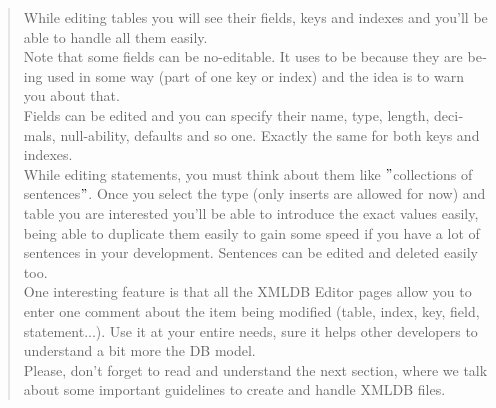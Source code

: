 \documentclass[a4paper]{report}  %
\begin{document}
\begin{otherlanguage}{english}
\begin{quote}
While editing tables you will see their fields, keys and indexes and you'll be able to handle all them easily.\\
Note that some fields can be no-editable. It uses to be because they are being used in some way (part of one key or index) and the idea is to warn you about that.\\
Fields can be edited and you can specify their name, type, length, decimals, null-ability, defaults and so one. Exactly the same for both keys and indexes.\\
While editing statements, you must think about them like $"$collections of sentences$"$. Once you select the type (only inserts are allowed for now) and table you are interested you'll be able to introduce the exact values easily, being able to duplicate them easily to gain some speed if you have a lot of sentences in your development. Sentences can be edited and deleted easily too.\\
One interesting feature is that all the XMLDB Editor pages allow you to enter one comment about the item being modified (table, index, key, field, statement...). Use it at your entire needs, sure it helps other developers to understand a bit more the DB model.\\
Please, don't forget to read and understand the next section, where we talk about some important guidelines to create and handle XMLDB files.\\
\end{quote}
\end{otherlanguage}
\end{document}
